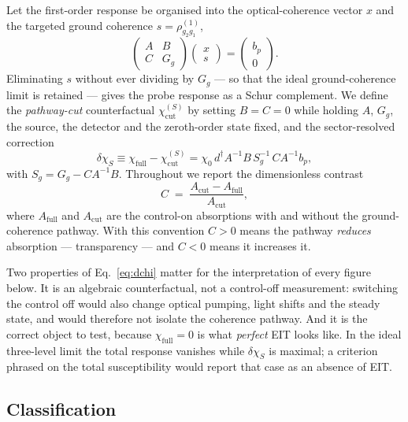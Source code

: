 \documentclass[
  reprint,
  amsmath,amssymb,
  aps,pra,
  superscriptaddress,
  floatfix,
]{revtex4-2}
\newcommand{\dchi}{\delta\chi_{S}}
\newcommand{\Acut}{A_{\mathrm{cut}}}
\newcommand{\Afull}{A_{\mathrm{full}}}
\begin{document}
Let the first-order response be organised into the optical-coherence vector
$x$ and the targeted ground coherence $s=\rho^{(1)}_{g_{2}g_{1}}$,
%
\begin{equation}
\begin{pmatrix} A & B\\ C & G_{g}\end{pmatrix}
\begin{pmatrix} x\\ s\end{pmatrix}
=\begin{pmatrix} b_{p}\\ 0\end{pmatrix}.
\label{eq:block}
\end{equation}
%
Eliminating $s$ without ever dividing by $G_{g}$ --- so that the ideal
ground-coherence limit is retained --- gives the probe response as a Schur
complement. We define the \emph{pathway-cut} counterfactual
$\chi^{(S)}_{\mathrm{cut}}$ by setting $B=C=0$ while holding $A$, $G_{g}$, the
source, the detector and the zeroth-order state fixed, and the
sector-resolved correction
%
\begin{equation}
\dchi \equiv \chi_{\mathrm{full}}-\chi^{(S)}_{\mathrm{cut}}
= \chi_{0}\, d^{\dagger}A^{-1}B\,S_{g}^{-1}\,CA^{-1}b_{p},
\label{eq:dchi}
\end{equation}
%
with $S_{g}=G_{g}-CA^{-1}B$. Throughout we report the dimensionless contrast
%
\begin{equation}
C \;=\; \frac{\Acut-\Afull}{\Acut},
\label{eq:contrast}
\end{equation}
%
where $\Afull$ and $\Acut$ are the control-on absorptions with and without the
ground-coherence pathway. With this convention $C>0$ means the pathway
\emph{reduces} absorption --- transparency --- and $C<0$ means it increases
it.

Two properties of Eq.~\eqref{eq:dchi} matter for the interpretation of every
figure below. It is an algebraic counterfactual, not a control-off
measurement: switching the control off would also change optical pumping,
light shifts and the steady state, and would therefore not isolate the
coherence pathway. And it is the correct object to test, because
$\chi_{\mathrm{full}}=0$ is what \emph{perfect} EIT looks like. In the ideal
three-level limit the total response vanishes while $\dchi$ is maximal; a
criterion phrased on the total susceptibility would report that case as an
absence of EIT.

\subsection{Classification}
\end{document}
